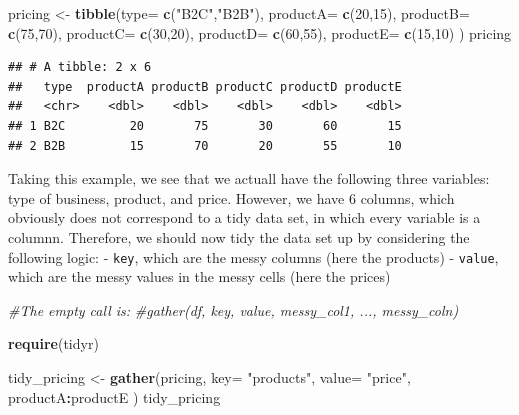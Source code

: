 \documentclass[]{report}
\newenvironment{Shaded}{\begin{snugshade}}{\end{snugshade}}
\newcommand{\KeywordTok}[1]{\textcolor[rgb]{0.13,0.29,0.53}{\textbf{#1}}}
\newcommand{\DataTypeTok}[1]{\textcolor[rgb]{0.13,0.29,0.53}{#1}}
\newcommand{\DecValTok}[1]{\textcolor[rgb]{0.00,0.00,0.81}{#1}}
\newcommand{\StringTok}[1]{\textcolor[rgb]{0.31,0.60,0.02}{#1}}
\newcommand{\CommentTok}[1]{\textcolor[rgb]{0.56,0.35,0.01}{\textit{#1}}}
\newcommand{\OperatorTok}[1]{\textcolor[rgb]{0.81,0.36,0.00}{\textbf{#1}}}
\newcommand{\NormalTok}[1]{#1}
\begin{document}
\begin{Shaded}
\begin{Highlighting}[]
\NormalTok{pricing <-}\StringTok{ }\KeywordTok{tibble}\NormalTok{(}\DataTypeTok{type=} \KeywordTok{c}\NormalTok{(}\StringTok{"B2C"}\NormalTok{,}\StringTok{"B2B"}\NormalTok{),}
                  \DataTypeTok{productA=} \KeywordTok{c}\NormalTok{(}\DecValTok{20}\NormalTok{,}\DecValTok{15}\NormalTok{),}
                  \DataTypeTok{productB=} \KeywordTok{c}\NormalTok{(}\DecValTok{75}\NormalTok{,}\DecValTok{70}\NormalTok{),}
                  \DataTypeTok{productC=} \KeywordTok{c}\NormalTok{(}\DecValTok{30}\NormalTok{,}\DecValTok{20}\NormalTok{),}
                  \DataTypeTok{productD=} \KeywordTok{c}\NormalTok{(}\DecValTok{60}\NormalTok{,}\DecValTok{55}\NormalTok{),}
                  \DataTypeTok{productE=} \KeywordTok{c}\NormalTok{(}\DecValTok{15}\NormalTok{,}\DecValTok{10}\NormalTok{)}
\NormalTok{                    )}
\NormalTok{pricing}
\end{Highlighting}
\end{Shaded}

\begin{verbatim}
## # A tibble: 2 x 6
##   type  productA productB productC productD productE
##   <chr>    <dbl>    <dbl>    <dbl>    <dbl>    <dbl>
## 1 B2C         20       75       30       60       15
## 2 B2B         15       70       20       55       10
\end{verbatim}

Taking this example, we see that we actuall have the following three
variables: type of business, product, and price. However, we have 6
columns, which obviously does not correspond to a tidy data set, in
which every variable is a columnn. Therefore, we should now tidy the
data set up by considering the following logic: - \texttt{key}, which
are the messy columns (here the products) - \texttt{value}, which are
the messy values in the messy cells (here the prices)

\begin{Shaded}
\begin{Highlighting}[]
\CommentTok{#The empty call is:}
\CommentTok{#gather(df, key, value, messy_col1, ..., messy_coln)}

\KeywordTok{require}\NormalTok{(tidyr)}

\NormalTok{tidy_pricing <-}\StringTok{ }\KeywordTok{gather}\NormalTok{(pricing,}
                        \DataTypeTok{key=} \StringTok{"products"}\NormalTok{,}
                        \DataTypeTok{value=} \StringTok{"price"}\NormalTok{,}
\NormalTok{                        productA}\OperatorTok{:}\NormalTok{productE}
\NormalTok{                        ) }
\NormalTok{tidy_pricing}
\end{Highlighting}
\end{Shaded}
\end{document}
